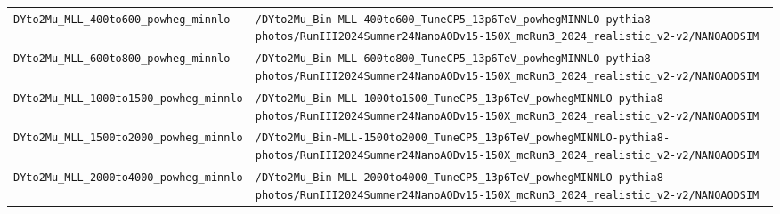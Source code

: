 \begin{longtable}{@{}>{\RaggedRight\arraybackslash}p{} >{\RaggedRight\arraybackslash}p{}@{}}
\addlinespace[2pt]
\texttt{DYto2Mu\_\allowbreak{}MLL\_\allowbreak{}400to600\_\allowbreak{}powheg\_\allowbreak{}minnlo} & \texttt{/\allowbreak{}DYto2Mu\_\allowbreak{}Bin-\allowbreak{}MLL-\allowbreak{}400to600\_\allowbreak{}TuneCP5\_\allowbreak{}13p6TeV\_\allowbreak{}powhegMINNLO-\allowbreak{}pythia8-\allowbreak{}photos/\allowbreak{}RunIII2024Summer24NanoAODv15-\allowbreak{}150X\_\allowbreak{}mcRun3\_\allowbreak{}2024\_\allowbreak{}realistic\_\allowbreak{}v2-\allowbreak{}v2/\allowbreak{}NANOAODSIM} \\
\addlinespace[2pt]
\texttt{DYto2Mu\_\allowbreak{}MLL\_\allowbreak{}600to800\_\allowbreak{}powheg\_\allowbreak{}minnlo} & \texttt{/\allowbreak{}DYto2Mu\_\allowbreak{}Bin-\allowbreak{}MLL-\allowbreak{}600to800\_\allowbreak{}TuneCP5\_\allowbreak{}13p6TeV\_\allowbreak{}powhegMINNLO-\allowbreak{}pythia8-\allowbreak{}photos/\allowbreak{}RunIII2024Summer24NanoAODv15-\allowbreak{}150X\_\allowbreak{}mcRun3\_\allowbreak{}2024\_\allowbreak{}realistic\_\allowbreak{}v2-\allowbreak{}v2/\allowbreak{}NANOAODSIM} \\
\addlinespace[2pt]
\texttt{DYto2Mu\_\allowbreak{}MLL\_\allowbreak{}1000to1500\_\allowbreak{}powheg\_\allowbreak{}minnlo} & \texttt{/\allowbreak{}DYto2Mu\_\allowbreak{}Bin-\allowbreak{}MLL-\allowbreak{}1000to1500\_\allowbreak{}TuneCP5\_\allowbreak{}13p6TeV\_\allowbreak{}powhegMINNLO-\allowbreak{}pythia8-\allowbreak{}photos/\allowbreak{}RunIII2024Summer24NanoAODv15-\allowbreak{}150X\_\allowbreak{}mcRun3\_\allowbreak{}2024\_\allowbreak{}realistic\_\allowbreak{}v2-\allowbreak{}v2/\allowbreak{}NANOAODSIM} \\
\addlinespace[2pt]
\texttt{DYto2Mu\_\allowbreak{}MLL\_\allowbreak{}1500to2000\_\allowbreak{}powheg\_\allowbreak{}minnlo} & \texttt{/\allowbreak{}DYto2Mu\_\allowbreak{}Bin-\allowbreak{}MLL-\allowbreak{}1500to2000\_\allowbreak{}TuneCP5\_\allowbreak{}13p6TeV\_\allowbreak{}powhegMINNLO-\allowbreak{}pythia8-\allowbreak{}photos/\allowbreak{}RunIII2024Summer24NanoAODv15-\allowbreak{}150X\_\allowbreak{}mcRun3\_\allowbreak{}2024\_\allowbreak{}realistic\_\allowbreak{}v2-\allowbreak{}v2/\allowbreak{}NANOAODSIM} \\
\addlinespace[2pt]
\texttt{DYto2Mu\_\allowbreak{}MLL\_\allowbreak{}2000to4000\_\allowbreak{}powheg\_\allowbreak{}minnlo} & \texttt{/\allowbreak{}DYto2Mu\_\allowbreak{}Bin-\allowbreak{}MLL-\allowbreak{}2000to4000\_\allowbreak{}TuneCP5\_\allowbreak{}13p6TeV\_\allowbreak{}powhegMINNLO-\allowbreak{}pythia8-\allowbreak{}photos/\allowbreak{}RunIII2024Summer24NanoAODv15-\allowbreak{}150X\_\allowbreak{}mcRun3\_\allowbreak{}2024\_\allowbreak{}realistic\_\allowbreak{}v2-\allowbreak{}v2/\allowbreak{}NANOAODSIM} \\

\end{longtable}
